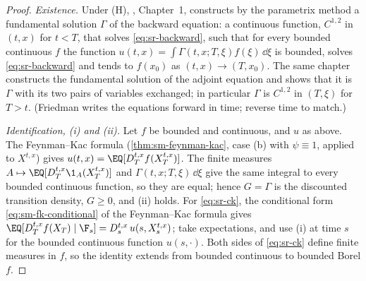 \begin{proof}
\emph{Existence.} Under (H), \textcite{friedman-parabolic}, Chapter~1, constructs by the parametrix method a
fundamental solution $\Gamma$ of the backward equation: a continuous function, $C^{1,2}$ in $(t,x)$ for $t<T$,
that solves \eqref{eq:sr-backward}, such that for every bounded continuous $f$ the function
$u(t,x)=\int\Gamma(t,x;T,\xi)f(\xi)\,\dd\xi$ is bounded, solves \eqref{eq:sr-backward} and tends to $f(x_0)$ as
$(t,x)\to(T,x_0)$. The same chapter constructs the fundamental solution of the adjoint equation and shows that
it is $\Gamma$ with its two pairs of variables exchanged; in particular $\Gamma$ is $C^{1,2}$ in $(T,\xi)$ for $T>t$.
(Friedman writes the equations forward in time; reverse time to match.)

\emph{Identification, (i) and (ii).} Let $f$ be bounded and continuous, and $u$ as above. The Feynman--Kac formula
(\cref{thm:sm-feynman-kac}, case (b) with $\psi\equiv1$, applied to $X^{t,x}$) gives
$u(t,x)=\EQ[D^{t,x}_Tf(X^{t,x}_T)]$. The finite measures $A\mapsto\EQ[D^{t,x}_T\1_A(X^{t,x}_T)]$ and
$\Gamma(t,x;T,\xi)\,\dd\xi$ give the same integral to every bounded continuous function, so they are equal; hence
$G=\Gamma$ is the discounted transition density, $G\ge0$, and (ii) holds. For \eqref{eq:sr-ck}, the conditional form
\eqref{eq:sm-fk-conditional} of the Feynman--Kac formula gives
$\EQ[D^{t,x}_Tf(X_T)\mid\F_s]=D^{t,x}_s\,u(s,X^{t,x}_s)$; take expectations, and use (i) at time $s$ for the bounded
continuous function $u(s,\cdot)$. Both sides of \eqref{eq:sr-ck} define finite measures in $f$, so the identity
extends from bounded continuous to bounded Borel $f$.


\end{proof}

